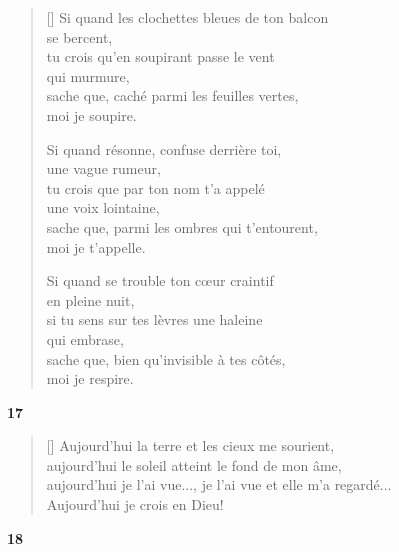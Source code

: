 \documentclass[a4paper,12pt]{book}
\begin{document}
\begin{verse}[\versewidth]
  Si quand les clochettes bleues de ton balcon \\
  se bercent, \\
  tu crois qu'en soupirant passe le vent \\
  qui murmure, \\
  sache que, caché parmi les feuilles vertes, \\
  moi je soupire.

  Si quand résonne, confuse derrière toi, \\
  une vague rumeur, \\
  tu crois que par ton nom t'a appelé \\
  une voix lointaine, \\
  sache que, parmi les ombres qui t'entourent, \\
  moi je t'appelle.

  Si quand se trouble ton cœur craintif \\
  en pleine nuit, \\
  si tu sens sur tes lèvres une haleine \\
  qui embrase, \\
  sache que, bien qu'invisible à tes côtés, \\
  moi je respire.
\end{verse}

\bigskip

\begin{center}
  \textbf{17}
\end{center}

\settowidth{\versewidth}{aujourd'hui je l'ai vue..., je l'ai vue et elle m'a regardé...}

\begin{verse}[\versewidth]
  Aujourd'hui la terre et les cieux me sourient, \\
  aujourd'hui le soleil atteint le fond de mon âme, \\
  aujourd'hui je l'ai vue..., je l'ai vue et elle m'a regardé... \\
  Aujourd'hui je crois en Dieu!
\end{verse}

\bigskip

\begin{center}
  \textbf{18}
\end{center}
\end{document}

